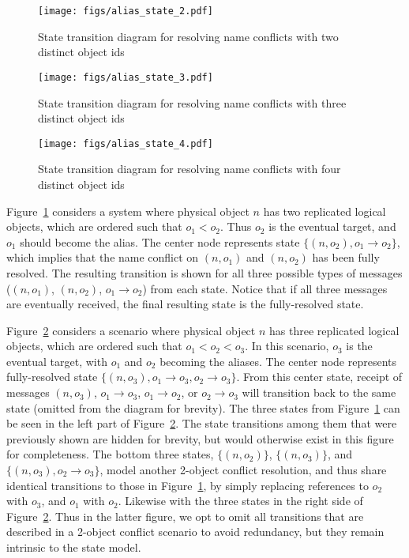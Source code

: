 \begin{figure}[t]
\centering
\texttt{[image: figs/alias\_state\_2.pdf]}
\caption{State transition diagram for resolving name conflicts with two distinct
object ids}
\label{fig:aliasstate2}
\end{figure}

\begin{figure}[t]
\centering
\texttt{[image: figs/alias\_state\_3.pdf]}
\caption{State transition diagram for resolving name conflicts with three distinct
object ids}
\label{fig:aliasstate3}
\end{figure}

\begin{figure}[t]
\centering
\texttt{[image: figs/alias\_state\_4.pdf]}
\caption{State transition diagram for resolving name conflicts with four distinct
object ids}
\label{fig:aliasstate4}
\end{figure}




Figure~\ref{fig:aliasstate2} considers a system where physical object $n$ has
two replicated logical objects, which are ordered such that $o_1 < o_2$. Thus
$o_2$ is the eventual target, and $o_1$ should become the alias. The center node
represents state $\{(n,o_2), o_1\rightarrow o_2\}$, which implies that the name
conflict on $(n,o_1)$ and $(n,o_2)$ has been fully resolved. The resulting
transition is shown for all three possible types of messages ($(n,o_1)$,
$(n,o_2)$, $o_1\rightarrow o_2$) from each state. Notice that if all three
messages are eventually received, the final resulting state is the
fully-resolved state.


Figure~\ref{fig:aliasstate3} considers a scenario where physical
object $n$ has three replicated logical objects, which are ordered such that
$o_1 < o_2 < o_3$. In this scenario, $o_3$ is the eventual target, with $o_1$
and $o_2$ becoming the aliases. The center node represents fully-resolved state
$\{(n,o_3), o_1\rightarrow o_3, o_2 \rightarrow o_3\}$. From this center state,
receipt of messages $(n,o_3)$, $o_1\rightarrow o_3$, $o_1\rightarrow o_2$, or
$o_2 \rightarrow o_3$ will transition back to the same state (omitted from the
diagram for brevity). The three states from Figure~\ref{fig:aliasstate2} can be
seen in the left part of Figure~\ref{fig:aliasstate3}. The state transitions
among them that were previously shown are hidden for brevity, but would
otherwise exist in this figure for completeness. The bottom three states,
$\{(n,o_2)\}$, $\{(n,o_3)\}$, and $\{(n,o_3), o_2\rightarrow o_3\}$, model
another 2-object conflict resolution, and thus share identical transitions to
those in Figure~\ref{fig:aliasstate2}, by simply replacing references to $o_2$
with $o_3$, and $o_1$ with $o_2$. Likewise with the three states in the right
side of Figure~\ref{fig:aliasstate3}. Thus in the latter figure, we opt to omit
all transitions that are described in a 2-object conflict scenario to avoid
redundancy, but they remain intrinsic to the state model.

